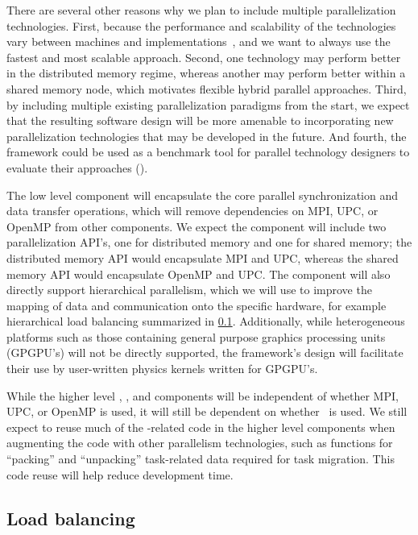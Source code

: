 \documentclass[10pt,twocolumn]{article}
\begin{document}
There are several other reasons why we plan to include multiple
parallelization technologies.  First, because the performance and
scalability of the technologies vary between machines and
implementations~\cite{MaTa09}, and we want to always use the fastest
and most scalable approach.  Second, one technology may perform better
in the distributed memory regime, whereas another may perform better
within a shared memory node, which motivates flexible hybrid parallel
approaches.  Third, by including multiple existing parallelization
paradigms from the start, we expect that the resulting software design
will be more amenable to incorporating new parallelization
technologies that may be developed in the future.  And fourth, the
framework could be used as a benchmark tool for parallel technology
designers to evaluate their approaches (\cite{WeSu07}).

The low level  component will encapsulate the core
parallel synchronization and data transfer operations, which will
remove dependencies on MPI, UPC, or OpenMP from other components.  We
expect the  component will include two parallelization
API's, one for distributed memory and one for shared memory; the
distributed memory API would encapsulate MPI and UPC, whereas the
shared memory API would encapsulate OpenMP and UPC.  The
 component will also directly support hierarchical
parallelism, which we will use to improve the mapping of data and
communication onto the specific hardware, for example hierarchical
load balancing summarized in \ref{ss:design-balance}.  Additionally,
while heterogeneous platforms such as those containing general purpose
graphics processing units (GPGPU's) will not be directly supported,
the framework's design will facilitate their use by user-written
physics kernels written for GPGPU's.

While the higher level , , and
 components will be independent of whether MPI, UPC,
or OpenMP is used, it will still be dependent on whether \charm\ is
used.  We still expect to reuse much of the \charm-related code in the
higher level components when augmenting the code with other
parallelism technologies, such as functions for ``packing'' and
``unpacking'' task-related data required for task migration.  This
code reuse will help reduce development time.

\subsection{Load balancing} \label{ss:design-balance}
\end{document}

